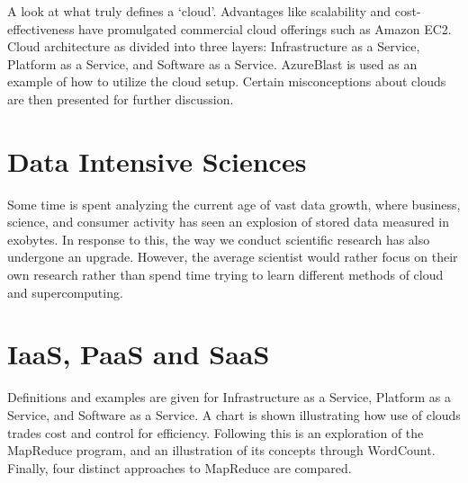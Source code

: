 A look at what truly defines a `cloud'. Advantages like scalability and
cost-effectiveness have promulgated commercial cloud offerings such as
Amazon EC2. Cloud architecture as divided into three layers:
Infrastructure as a Service, Platform as a Service, and Software as a
Service. AzureBlast is used as an example of how to utilize the cloud
setup. Certain misconceptions about clouds are then presented for
further discussion.



\section{Data Intensive Sciences}

Some time is spent analyzing the current age of vast data growth, where
business, science, and consumer activity has seen an explosion of stored
data measured in exobytes. In response to this, the way we conduct
scientific research has also undergone an upgrade. However, the average
scientist would rather focus on their own research rather than spend
time trying to learn different methods of cloud and supercomputing.



\section{IaaS, PaaS and SaaS}

Definitions and examples are given for Infrastructure as a Service,
Platform as a Service, and Software as a Service. A chart is shown
illustrating how use of clouds trades cost and control for efficiency.
Following this is an exploration of the MapReduce program, and an
illustration of its concepts through WordCount. Finally, four distinct
approaches to MapReduce are compared.



